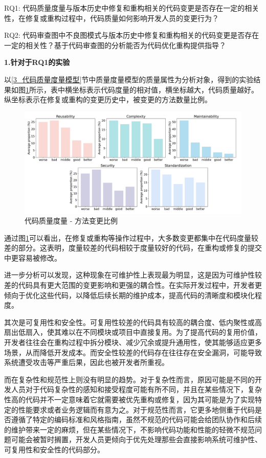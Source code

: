 RQ1: 代码质量度量与版本历史中修复和重构相关的代码变更是否存在一定的相关性，在修复或重构过程中，代码质量如何影响开发人员的变更行为？

RQ2: 代码审查图中不良图模式与版本历史中修复和重构相关的代码变更是否存在一定的相关性？基于代码审查图的分析能否为代码优化重构提供指导？


\textbf{1.针对于RQ1的实验}


以\ref{3_代码质量度量模型}节中质量度量模型的质量属性为分析对象，得到的实验结果如图\ref{1_度量模型分析实验}所示，表中横坐标表示代码度量的相对值，横坐标越大，代码质量越好。纵坐标表示在修复或重构的变更历史中，被变更的方法数量比例。

\begin{figure}[h]
\centering
\includegraphics[width = 1\textwidth]{figures/3_度量实验.png}
\caption{代码质量度量 - 方法变更比例}
\label{1_度量模型分析实验}
\end{figure}


通过图\ref{1_度量模型分析实验}可以看出，在修复或重构等操作过程中，大多数变更都集中在代码度量较差的部分。这表明，度量较差的代码相较于度量较好的代码，在重构或修复的提交中更容易被修改。

进一步分析可以发现，这种现象在可维护性上表现最为明显，这是因为可维护性较差的代码具有更大范围的变更影响和更强的耦合性。在实际开发过程中，开发者更倾向于优化这些代码，以降低后续长期的维护成本，提高代码的清晰度和模块化程度。

其次是可复用性和安全性。可复用性较差的代码具有较高的耦合度、低内聚性或高扇出低扇入，使其难以在不同模块或项目中直接复用。为了提高代码的复用价值，开发者往往会在重构过程中拆分模块、减少冗余或提升通用性，使其能够适应更多场景，从而降低开发成本。而安全性较差的代码存在往往存在安全漏洞，可能导致系统遭受攻击等严重后果，因此也被开发者所重视。

而在复杂性和规范性上则没有明显的趋势。对于复杂性而言，原因可能是不同的开发人员对于代码复杂性的感知和接受程度可能有所不同，并且在某些情况下，复杂性高的代码并不一定意味着它就需要被优先重构或修复，因为其可能是为了实现特定的性能要求或者业务逻辑而有意为之。对于规范性而言，它更多地侧重于代码是否遵循了特定的编码标准和风格指南，虽然不规范的代码可能会给团队协作和后续的维护带来一定的麻烦，但在某些情况下，不影响代码功能和性能的轻微不规范问题可能会被暂时搁置，开发人员更倾向于优先处理那些会直接影响系统可维护性、可复用性和安全性的代码部分。

